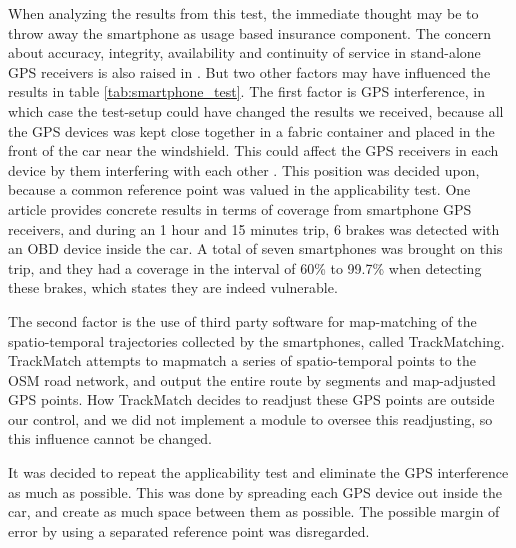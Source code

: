 When analyzing the results from this test, the immediate thought may be to throw away the smartphone as usage based insurance component. The concern about accuracy, integrity, availability and continuity of service in stand-alone GPS receivers is also raised in\citep{art:challenges_smartphone_ubi} \citep{art:survey_mobile_phone_sensing} \citep{art:smartphones_for_monitoring_and_ubi} \citep{art:insurtelematics} \citep{art:in-car_positioning_technologies}. But two other factors may have influenced the results in table \ref{tab:smartphone_test}. The first factor is GPS interference, in which case the test-setup could have changed the results we received, because all the GPS devices was kept close together in a fabric container and placed in the front of the car near the windshield. This could affect the GPS receivers in each device by them interfering with each other\citep{art:gps_interference_one} \citep{art:gps_interference_two}. This position was decided upon, because a common reference point was valued in the applicability test. One article provides concrete results in terms of coverage from smartphone GPS receivers, and during an 1 hour and 15 minutes trip, 6 brakes was detected with an OBD device inside the car. A total of seven smartphones was brought on this trip, and they had a coverage in the interval of 60\% to 99.7\% when detecting these brakes\citep{art:insurtelematics}, which states they are indeed vulnerable.

The second factor is the use of third party software for map-matching of the spatio-temporal trajectories collected by the smartphones, called TrackMatching\citep{trackmatch}. TrackMatch attempts to mapmatch a series of spatio-temporal points to the OSM road network, and output the entire route by segments and map-adjusted GPS points. How TrackMatch decides to readjust these GPS points are outside our control, and we did not implement a module to oversee this readjusting, so this influence cannot be changed. 

It was decided to repeat the applicability test and eliminate the GPS interference as much as possible. This was done by spreading each GPS device out inside the car, and create as much space between them as possible. The possible margin of error by using a separated reference point was disregarded. 

